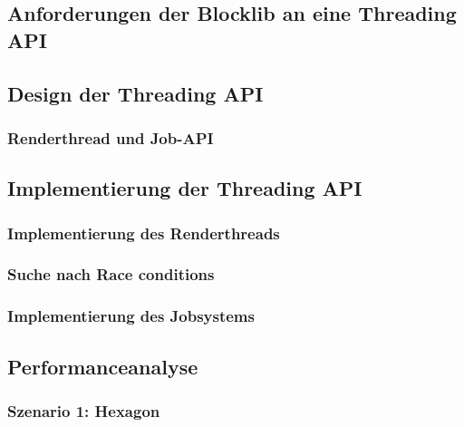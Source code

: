 \documentclass[12pt,a4paper,listof=totocnumbered,parskip=half,numbers=noenddot]{scrartcl}
\begin{document}
\subsection{Anforderungen der Blocklib an eine Threading API}\label{sec:anforderungen}


\subsection{Design der Threading API}

\subsubsection{Renderthread und Job-API}


\subsection{Implementierung der Threading API}

\subsubsection{Implementierung des Renderthreads}


\subsubsection{Suche nach Race conditions}

\subsubsection{Implementierung des Jobsystems}


\subsection{Performanceanalyse}

\subsubsection{Szenario 1: Hexagon}

\end{document}
